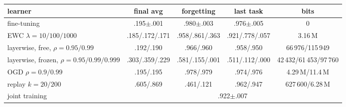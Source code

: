 \begin{tabular}{lcccc}
\toprule
learner & final avg & forgetting & last task & bits \\
\midrule
fine-tuning & .195$\pm$.001 & .980$\pm$.003 & .976$\pm$.005 & 0 \\
EWC $\lambda=10/100/1000$ & .185/.172/.171 & .958/.861/.363 & .921/.778/.057 & 3.16\,M \\
layerwise, free, $\rho=0.95/0.99$ & .192/.190 & .966/.960 & .958/.950 & 66\,976/115\,949 \\
layerwise, frozen, $\rho=0.95/0.99/0.999$ & .303/.359/.229 & .581/.155/.001 & .511/.112/.000 & 42\,432/61\,453/97\,760 \\
OGD $\rho=0.9/0.99$ & .195/.195 & .978/.979 & .974/.976 & 4.29\,M/11.4\,M \\
replay $k=20/200$ & .605/.869 & .461/.121 & .962/.947 & 627\,600/6.28\,M \\
joint training & \multicolumn{4}{c}{.922$\pm$.007} \\
\bottomrule
\end{tabular}
